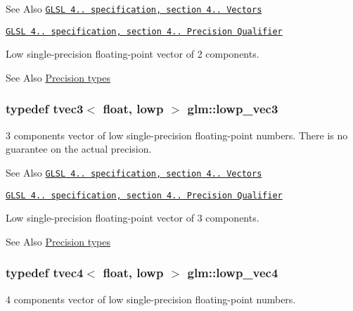 \begin{DoxySeeAlso}{See Also}
\href{http://www.opengl.org/registry/doc/GLSLangSpec.4.20.8.pdf}{\tt G\-L\-S\-L 4.. specification, section 4.. Vectors} 

\href{http://www.opengl.org/registry/doc/GLSLangSpec.4.20.8.pdf}{\tt G\-L\-S\-L 4.. specification, section 4.. Precision Qualifier}
\end{DoxySeeAlso}
Low single-\/precision floating-\/point vector of 2 components. \begin{DoxySeeAlso}{See Also}
\hyperlink{group__core__precision}{Precision types} 
\end{DoxySeeAlso}
\hypertarget{group__core__precision_ga0229a1c4abd7c51f15eeb7a0fec3846b}{
\subsubsection[{lowp\-\_\-vec3}]{\setlength{\rightskip}{0pt plus 5cm}typedef tvec3$<$ float, lowp $>$ {\bf glm\-::lowp\-\_\-vec3}}}\label{group__core__precision_ga0229a1c4abd7c51f15eeb7a0fec3846b}
3 components vector of low single-\/precision floating-\/point numbers. There is no guarantee on the actual precision.

\begin{DoxySeeAlso}{See Also}
\href{http://www.opengl.org/registry/doc/GLSLangSpec.4.20.8.pdf}{\tt G\-L\-S\-L 4.. specification, section 4.. Vectors} 

\href{http://www.opengl.org/registry/doc/GLSLangSpec.4.20.8.pdf}{\tt G\-L\-S\-L 4.. specification, section 4.. Precision Qualifier}
\end{DoxySeeAlso}
Low single-\/precision floating-\/point vector of 3 components. \begin{DoxySeeAlso}{See Also}
\hyperlink{group__core__precision}{Precision types} 
\end{DoxySeeAlso}
\hypertarget{group__core__precision_gabb82786cbefa101e9eb0cff63cecb1f2}{
\subsubsection[{lowp\-\_\-vec4}]{\setlength{\rightskip}{0pt plus 5cm}typedef tvec4$<$ float, lowp $>$ {\bf glm\-::lowp\-\_\-vec4}}}\label{group__core__precision_gabb82786cbefa101e9eb0cff63cecb1f2}
4 components vector of low single-\/precision floating-\/point numbers.


